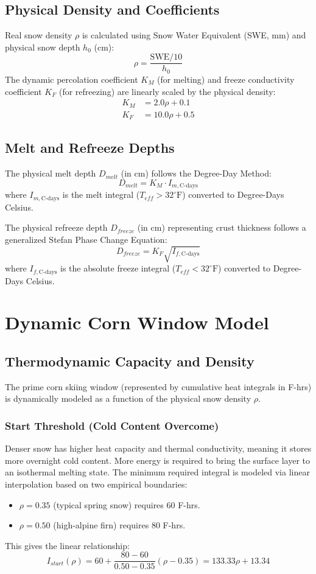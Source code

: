 \documentclass[11pt]{article}
\begin{document}
\subsection{Physical Density and Coefficients}
Real snow density $\rho$ is calculated using Snow Water Equivalent (SWE, mm) and physical snow depth $h_0$ (cm):
\[
\rho = \frac{\text{SWE}/10}{h_0}
\]
The dynamic percolation coefficient $K_M$ (for melting) and freeze conductivity coefficient $K_F$ (for refreezing) are linearly scaled by the physical density:
\begin{align*}
K_M &= 2.0\rho + 0.1 \\
K_F &= 10.0\rho + 0.5
\end{align*}

\subsection{Melt and Refreeze Depths}
The physical melt depth $D_{melt}$ (in cm) follows the Degree-Day Method:
\[
D_{melt} = K_M \cdot I_{m,\text{C-days}}
\]
where $I_{m,\text{C-days}}$ is the melt integral ($T_{eff} > 32^\circ\text{F}$) converted to Degree-Days Celsius.

The physical refreeze depth $D_{freeze}$ (in cm) representing crust thickness follows a generalized Stefan Phase Change Equation:
\[
D_{freeze} = K_F \sqrt{I_{f,\text{C-days}}}
\]
where $I_{f,\text{C-days}}$ is the absolute freeze integral ($T_{eff} < 32^\circ\text{F}$) converted to Degree-Days Celsius.

\section{Dynamic Corn Window Model}
\subsection{Thermodynamic Capacity and Density}
The prime corn skiing window (represented by cumulative heat integrals in F-hrs) is dynamically modeled as a function of the physical snow density $\rho$.

\subsubsection*{Start Threshold (Cold Content Overcome)}
Denser snow has higher heat capacity and thermal conductivity, meaning it stores more overnight cold content. More energy is required to bring the surface layer to an isothermal melting state. The minimum required integral is modeled via linear interpolation based on two empirical boundaries:
\begin{itemize}
    \item $\rho = 0.35$ (typical spring snow) requires $60$ F-hrs.
    \item $\rho = 0.50$ (high-alpine firn) requires $80$ F-hrs.
\end{itemize}
This gives the linear relationship:
\[
I_{start}(\rho) = 60 + \frac{80 - 60}{0.50 - 0.35} (\rho - 0.35) = 133.33 \rho + 13.34
\]
\end{document}
